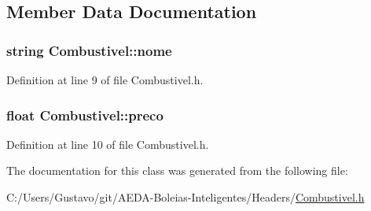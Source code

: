 \subsection{Member Data Documentation}
\hypertarget{class_combustivel_adfa329c4c4b60abcb87c1f3c82be4145}{
\subsubsection[{nome}]{\setlength{\rightskip}{0pt plus 5cm}string Combustivel\+::nome\hspace{0.3cm}{\ttfamily [private]}}}\label{class_combustivel_adfa329c4c4b60abcb87c1f3c82be4145}


Definition at line 9 of file Combustivel.\+h.

\hypertarget{class_combustivel_ac910a8410930ba553861f584da9f48d1}{
\subsubsection[{preco}]{\setlength{\rightskip}{0pt plus 5cm}float Combustivel\+::preco\hspace{0.3cm}{\ttfamily [private]}}}\label{class_combustivel_ac910a8410930ba553861f584da9f48d1}


Definition at line 10 of file Combustivel.\+h.



The documentation for this class was generated from the following file\+:\begin{DoxyCompactItemize}
\item 
C\+:/\+Users/\+Gustavo/git/\+A\+E\+D\+A-\/\+Boleias-\/\+Inteligentes/\+Headers/\hyperlink{_combustivel_8h}{Combustivel.\+h}\end{DoxyCompactItemize}
